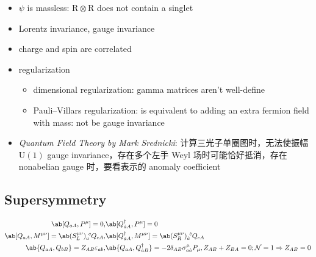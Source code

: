\documentclass{article}
\newcommand{\rmR}{\mathrm{R}}
\begin{document}
\begin{itemize}
    \item $\psi$ is massless: $\rmR \otimes \rmR$ does not contain a singlet
    \item Lorentz invariance, gauge invariance
    \item charge and spin are correlated
    \item regularization \begin{itemize}
              \item dimensional regularization: gamma matrices aren't well-define
              \item Pauli–Villars regularization: is equivalent to adding an extra fermion field with mass: not be gauge invariance
          \end{itemize}
    \item \textit{Quantum Field Theory by Mark Srednicki}: 计算三光子单圈图时，无法使振幅 $\mathrm{U}(1)$ gauge invariance，存在多个左手 Weyl 场时可能恰好抵消，存在 nonabelian gauge 时，要看表示的 anomaly coefficient
\end{itemize}

\subsection{Supersymmetry}

\begin{align*}
    \ab[Q_{aA}, P^{\mu}] = 0,                                       & \ab[Q_{\dot{a}A}^{\dagger}, P^{\mu}] = 0                                                                                                             \\
    \ab[Q_{aA}, M^{\mu\nu}] = \ab(S_{L}^{\mu\nu})_{a}^{\ c} Q_{cA}, & \ab[Q_{\dot{a}A}^{\dagger}, M^{\mu\nu}] = \ab(S_{R}^{\mu\nu})_{\dot{a}}^{\ \dot{c}} Q_{cA}                                                           \\
    \ab\{Q_{aA}, Q_{bB}\} = Z_{AB} \varepsilon_{ab},                & \ab\{Q_{aA}, Q_{\dot{a}B}^{\dagger}\} = - 2 \delta_{AB} \sigma_{a\dot{a}}^{\mu} P_{\mu}, Z_{AB} + Z_{BA} = 0; \mathcal{N} = 1 \Rightarrow Z_{AB} = 0
\end{align*}
\end{document}

